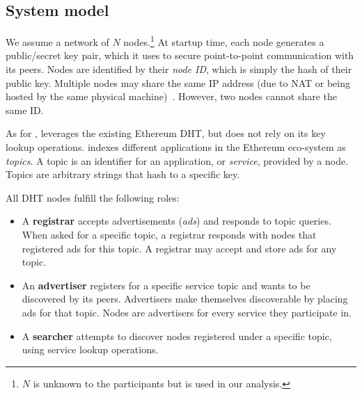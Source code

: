 \subsection{System model}

We assume a network of $N$ nodes.\footnote{$N$ is unknown to the participants but is used in our analysis.}
At startup time, each node generates a public/secret key pair, which it uses to secure point-to-point communication with its peers.
Nodes are identified by their \emph{node ID}, which is simply the hash of their public key.
Multiple nodes may share the same IP address (due to NAT or being hosted by the same physical machine)~\cite{marcus2018low}.
However, two nodes cannot share the same ID.


As for \discv, \sysname leverages the existing Ethereum DHT, but does not rely on its key lookup operations.
\sysname indexes different applications in the Ethereum eco-system as \emph{topics}.
A topic is an identifier for an application, or \emph{service}, provided by a node.
Topics are arbitrary strings that hash to a specific key. %

All DHT nodes fulfill the following roles:
\begin{itemize}
    \item A \textbf{registrar} accepts advertisements (\emph{ads}) and responds to topic queries. 
    When asked for a specific topic, a registrar responds with nodes that registered ads for this topic.
    A registrar may accept and store ads for any topic.
    \item An \textbf{advertiser} registers for a specific service topic and wants to be discovered by its peers.
    Advertisers make themselves discoverable by placing ads for that topic.
    Nodes are advertisers for every service they participate in.
    \item A \textbf{searcher} attempts to discover nodes registered under a specific topic, using service lookup operations.
\end{itemize}


